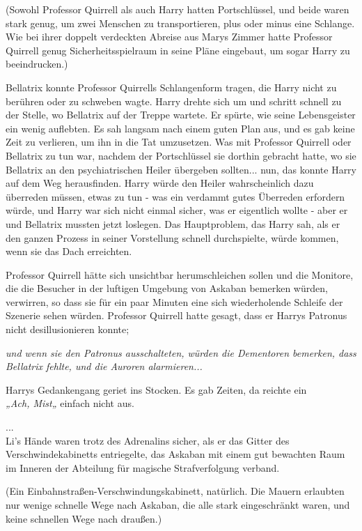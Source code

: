 {(Sowohl Professor Quirrell als auch Harry hatten Portschlüssel, und beide waren stark genug, um zwei Menschen zu transportieren, plus oder minus eine Schlange.\\ Wie bei ihrer doppelt verdeckten Abreise aus Marys Zimmer hatte Professor Quirrell genug Sicherheitsspielraum in seine Pläne eingebaut, um sogar Harry zu beeindrucken.)

Bellatrix konnte Professor Quirrells Schlangenform tragen, die Harry nicht zu berühren oder zu schweben wagte. Harry drehte sich um und schritt schnell zu der Stelle, wo Bellatrix auf der Treppe wartete. Er spürte, wie seine Lebensgeister ein wenig auflebten. Es sah langsam nach einem guten Plan aus, und es gab keine Zeit zu verlieren, um ihn in die Tat umzusetzen. Was mit Professor Quirrell oder Bellatrix zu tun war, nachdem der Portschlüssel sie dorthin gebracht hatte, wo sie Bellatrix an den psychiatrischen Heiler übergeben sollten... nun, das konnte Harry auf dem Weg herausfinden. Harry würde den Heiler wahrscheinlich dazu überreden müssen, etwas zu tun - was ein verdammt gutes Überreden erfordern würde, und Harry war sich nicht einmal sicher, was er eigentlich wollte - aber er und Bellatrix mussten jetzt loslegen. Das Hauptproblem, das Harry sah, als er den ganzen Prozess in seiner Vorstellung schnell durchspielte, würde kommen, wenn sie das Dach erreichten.

Professor Quirrell hätte sich unsichtbar herumschleichen sollen und die Monitore, die die Besucher in der luftigen Umgebung von Askaban bemerken würden, verwirren, so dass sie für ein paar Minuten eine sich wiederholende Schleife der Szenerie sehen würden. Professor Quirrell hatte gesagt, dass er Harrys Patronus nicht desillusionieren konnte;

\emph{und wenn sie den Patronus ausschalteten, würden die Dementoren bemerken, dass Bellatrix fehlte, und die Auroren alarmieren...}

Harrys Gedankengang geriet ins Stocken. Es gab Zeiten, da reichte ein\\ \emph{„Ach, Mist„} einfach nicht aus.

...\\ Li's Hände waren trotz des Adrenalins sicher, als er das Gitter des Verschwindekabinetts entriegelte, das Askaban mit einem gut bewachten Raum im Inneren der Abteilung für magische Strafverfolgung verband.

(Ein Einbahnstraßen-Verschwindungskabinett, natürlich. Die Mauern erlaubten nur wenige schnelle Wege nach Askaban, die alle stark eingeschränkt waren, und keine schnellen Wege nach draußen.)

}
